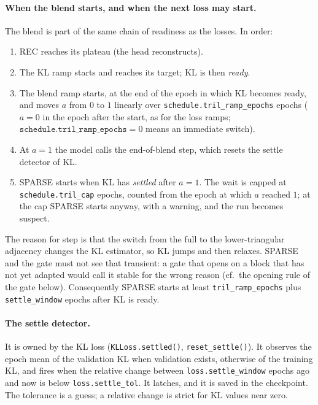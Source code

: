 \paragraph{When the blend starts, and when the next loss may start.}
The blend is part of the same chain of readiness as the losses. In order:
\begin{enumerate}[label=(\arabic*),leftmargin=2em]
\item REC reaches its plateau (the head reconstructs).
\item The KL ramp starts and reaches its target; KL is then \emph{ready}.
\item The blend ramp starts, at the end of the epoch in which KL becomes ready, and
      moves $a$ from $0$ to $1$ linearly over \texttt{schedule.tril\_ramp\_epochs}
      epochs ($a=0$ in the epoch after the start, as for the loss ramps; 
      $\texttt{schedule.tril\_ramp\_epochs} = 0$ means an immediate switch).
\item At $a=1$ the model calls the end-of-blend step, which resets the settle detector
      of KL.
\item \label{item:sche:sparsestart} SPARSE starts when KL has \emph{settled} after $a=1$. The wait is capped at
      \texttt{schedule.tril\_cap} epochs, counted from the epoch at which $a$ reached
      $1$; at the cap SPARSE starts anyway, with a warning, and the run becomes
      suspect.
\end{enumerate}
The reason for step  is that the switch from the full to the 
lower-triangular adjacency changes the KL estimator, so KL jumps and then relaxes. SPARSE and the 
gate must not see that transient: a gate that opens on a block that has not yet adapted
would call it stable for the wrong reason (cf.\ the opening rule of the gate below).
Consequently SPARSE starts at least \texttt{tril\_ramp\_epochs} plus
\texttt{settle\_window} epochs after KL is ready.

\paragraph{The settle detector.}
It is owned by the KL loss (\texttt{KLLoss.settled()}, \texttt{reset\_settle()}). It
observes the epoch mean of the validation KL when validation exists, otherwise of the
training KL, and fires when the relative change between \texttt{loss.settle\_window}
epochs ago and now is below \texttt{loss.settle\_tol}. It latches, and it is saved in
the checkpoint. The tolerance is a guess; a relative change is strict for KL values
near zero.

